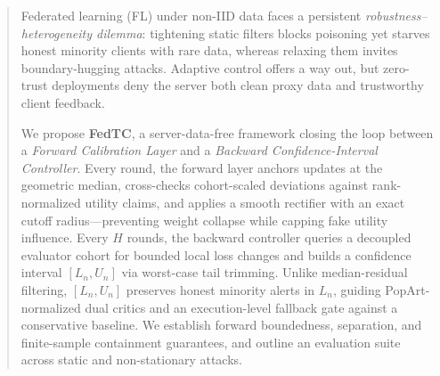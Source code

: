 \begin{abstract}
Federated learning (FL) under non-IID data faces a persistent \emph{robustness--heterogeneity dilemma}: tightening static filters blocks poisoning yet starves honest minority clients with rare data, whereas relaxing them invites boundary-hugging attacks. Adaptive control offers a way out, but zero-trust deployments deny the server both clean proxy data and trustworthy client feedback.

We propose \textbf{FedTC}, a server-data-free framework closing the loop between a \emph{Forward Calibration Layer} and a \emph{Backward Confidence-Interval Controller}. Every round, the forward layer anchors updates at the geometric median, cross-checks cohort-scaled deviations against rank-normalized utility claims, and applies a smooth rectifier with an exact cutoff radius---preventing weight collapse while capping fake utility influence. Every $H$ rounds, the backward controller queries a decoupled evaluator cohort for bounded local loss changes and builds a confidence interval $[L_n, U_n]$ via worst-case tail trimming. Unlike median-residual filtering, $[L_n, U_n]$ preserves honest minority alerts in $L_n$, guiding PopArt-normalized dual critics and an execution-level fallback gate against a conservative baseline. We establish forward boundedness, separation, and finite-sample containment guarantees, and outline an evaluation suite across static and non-stationary attacks.
\end{abstract}
